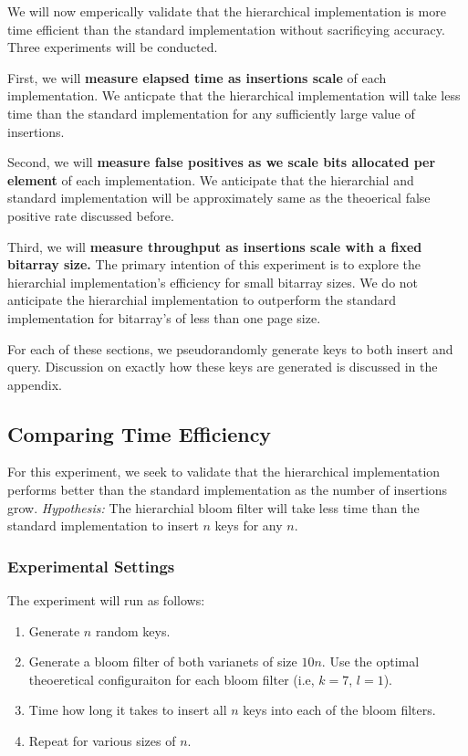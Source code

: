 We will now emperically validate that the hierarchical implementation is more time efficient than the standard implementation without sacrificying accuracy.
Three experiments will be conducted.

First, we will \textbf{measure elapsed time as insertions scale} of each implementation.
We anticpate that the hierarchical implementation will take less time than the standard implementation for any sufficiently large value of insertions.

Second, we will \textbf{measure false positives as we scale bits allocated per element} of each implementation.
We anticipate that the hierarchial and standard implementation will be approximately same as the theoerical false positive rate discussed before.

Third, we will \textbf{measure throughput as insertions scale with a fixed bitarray size.}
The primary intention of this experiment is to explore the hierarchial implementation's efficiency for small bitarray sizes.
We do not anticipate the hierarchial implementation to outperform the standard implementation for bitarray's of less than one page size.

For each of these sections, we pseudorandomly generate keys to both insert and query.
Discussion on exactly how these keys are generated is discussed in the appendix.

\subsection{Comparing Time Efficiency}

For this experiment, we seek to validate that the hierarchical implementation performs better than the standard implementation as the number of insertions grow.
\textit{Hypothesis:} The hierarchial bloom filter will take less time than the standard implementation to insert $n$ keys for any $n$.

\subsubsection{Experimental Settings}

The experiment will run as follows:
\begin{enumerate}
    \item Generate $n$ random keys.
    \item Generate a bloom filter of both varianets of size $10n$. Use the optimal theoeretical configuraiton for each bloom filter (i.e, $k=7$, $l=1$).
    \item Time how long it takes to insert all $n$ keys into each of the bloom filters.
    \item Repeat for various sizes of $n$.
\end{enumerate}

